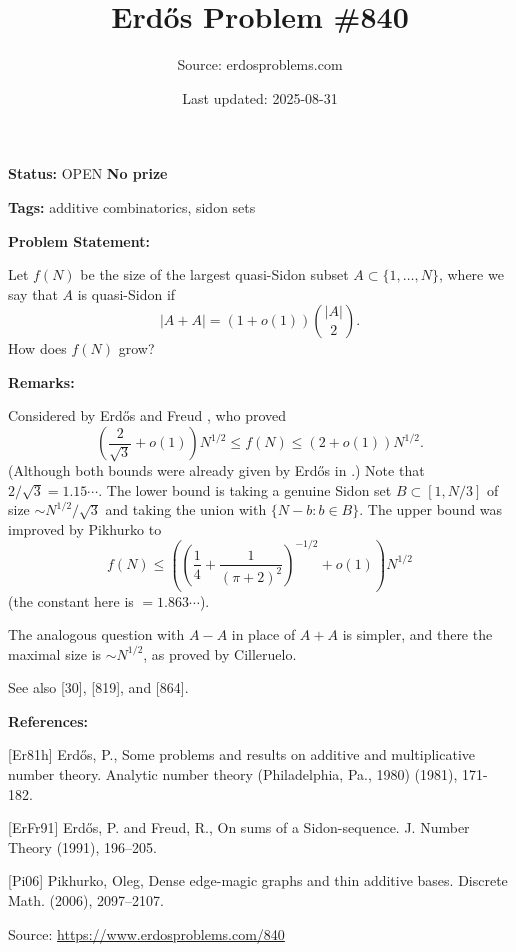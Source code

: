 \documentclass{article}
\title{Erd\H{o}s Problem \#840}
\date{Last updated: 2025-08-31}
\author{Source: erdosproblems.com}
\begin{document}
\maketitle

\noindent\textbf{Status:} OPEN \quad \textbf{No prize}

\noindent\textbf{Tags:} additive combinatorics, sidon sets

\medskip
\noindent\textbf{Problem Statement:}

Let $f(N)$ be the size of the largest quasi-Sidon subset $A\subset\{1,\ldots,N\}$, where we say that $A$ is quasi-Sidon if\[\lvert A+A\rvert=(1+o(1))\binom{\lvert A\rvert}{2}.\]How does $f(N)$ grow?

\bigskip
\noindent\textbf{Remarks:}

Considered by Erd\H{o}s and Freud \cite{ErFr91}, who proved\[\left(\frac{2}{\sqrt{3}}+o(1)\right)N^{1/2} \leq f(N) \leq \left(2+o(1)\right)N^{1/2}.\](Although both bounds were already given by Erd\H{o}s in \cite{Er81h}.) Note that $2/\sqrt{3}=1.15\cdots$. The lower bound is taking a genuine Sidon set $B\subset [1,N/3]$ of size $\sim N^{1/2}/\sqrt{3}$ and taking the union with $\{N-b : b\in B\}$. The upper bound was improved by Pikhurko \cite{Pi06} to\[f(N) \leq \left(\left(\frac{1}{4}+\frac{1}{(\pi+2)^2}\right)^{-1/2}+o(1)\right)N^{1/2}\](the constant here is $=1.863\cdots$).

The analogous question with $A-A$ in place of $A+A$ is simpler, and there the maximal size is $\sim N^{1/2}$, as proved by Cilleruelo.

See also [30], [819], and [864].

\bigskip
\noindent\textbf{References:}

[Er81h] Erd\H{o}s, P., Some problems and results on additive and multiplicative
number theory. Analytic number theory (Philadelphia, Pa., 1980) (1981), 171-182.
 
 [ErFr91] Erd\H{o}s, P. and Freud, R., On sums of a Sidon-sequence. J. Number Theory (1991), 196--205.
 
 [Pi06] Pikhurko, Oleg, Dense edge-magic graphs and thin additive bases. Discrete Math. (2006), 2097--2107.

\bigskip
\noindent\small{Source: \url{https://www.erdosproblems.com/840}}
\end{document}
